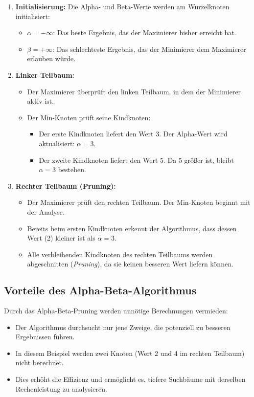 \begin{enumerate}
	\item \textbf{Initialisierung:} Die Alpha- und Beta-Werte werden am Wurzelknoten initialisiert:
	\begin{itemize}
		\item $\alpha = -\infty$: Das beste Ergebnis, das der Maximierer bisher erreicht hat.
		\item $\beta = +\infty$: Das schlechteste Ergebnis, das der Minimierer dem Maximierer erlauben würde.
	\end{itemize}
	
	\item \textbf{Linker Teilbaum:} 
	\begin{itemize}
		\item Der Maximierer überprüft den linken Teilbaum, in dem der Minimierer aktiv ist.
		\item Der Min-Knoten prüft seine Kindknoten:
		\begin{itemize}
			\item Der erste Kindknoten liefert den Wert 3. Der Alpha-Wert wird aktualisiert: $\alpha = 3$.
			\item Der zweite Kindknoten liefert den Wert 5. Da 5 größer ist, bleibt $\alpha = 3$ bestehen.
		\end{itemize}
	\end{itemize}
	
	\item \textbf{Rechter Teilbaum (Pruning):}
	\begin{itemize}
		\item Der Maximierer prüft den rechten Teilbaum. Der Min-Knoten beginnt mit der Analyse.
		\item Bereits beim ersten Kindknoten erkennt der Algorithmus, dass dessen Wert (2) kleiner ist als $\alpha = 3$.
		\item Alle verbleibenden Kindknoten des rechten Teilbaums werden abgeschnitten (\textit{Pruning}), da sie keinen besseren Wert liefern können.
	\end{itemize}
\end{enumerate}

\subsection*{Vorteile des Alpha-Beta-Algorithmus}

Durch das Alpha-Beta-Pruning werden unnötige Berechnungen vermieden:
\begin{itemize}
	\item Der Algorithmus durchsucht nur jene Zweige, die potenziell zu besseren Ergebnissen führen.
	\item In diesem Beispiel werden zwei Knoten (Wert 2 und 4 im rechten Teilbaum) nicht berechnet.
	\item Dies erhöht die Effizienz und ermöglicht es, tiefere Suchbäume mit derselben Rechenleistung zu analysieren.
\end{itemize}
